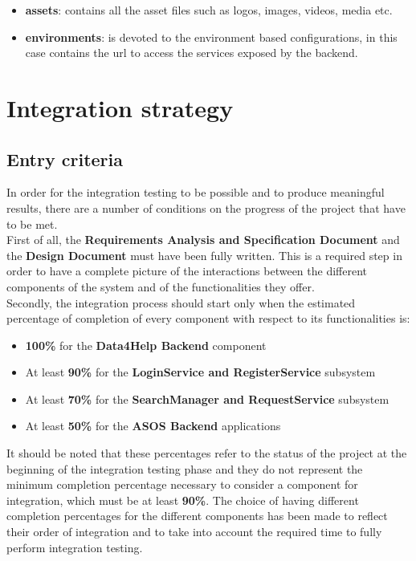 \documentclass[a4paper, hidelinks, 12pt]{report}
\begin{document}
\begin{itemize}
		\item \textbf{assets}: contains all the asset files such as logos, images, videos, media etc.
		\item \textbf{environments}:  is devoted to the environment based configurations, in this case contains the url to access the services exposed by the backend.
	\end{itemize}

	\chapter{Integration strategy}
	\section{Entry criteria}
	\label{sec:Entry Criteria}
	In order for the integration testing to be possible and to produce meaningful results, there are a number of conditions on the progress of the project that have to be met.\\
	\quad First of all, the \textbf{Requirements Analysis and Specification Document} and the \textbf{Design Document} must have been fully written. This is a required step in order to have a complete picture of the interactions between the different components of the system and of the functionalities they offer.\\

	\quad Secondly, the integration process should start only when the estimated percentage of completion of every component with respect to its functionalities is:
	\begin{itemize}
		\item{}\textbf{100\%} for the \textbf{Data4Help Backend} component
		\item{}At least \textbf{90\%} for the \textbf{LoginService and RegisterService} subsystem
		\item{}At least \textbf{70\%} for the \textbf{SearchManager and RequestService} subsystem
		\item{}At least \textbf{50\%} for the \textbf{ASOS Backend} applications
	\end{itemize}
	It should be noted that these percentages refer to the status of the project at the beginning of the integration testing phase and they do not represent the minimum completion percentage necessary to consider a component for integration, which must be at least \textbf{90\%}. The choice of having different completion percentages for the different components has been made to reflect their order of integration and to take into account the required time to fully perform integration testing.
\end{document}
